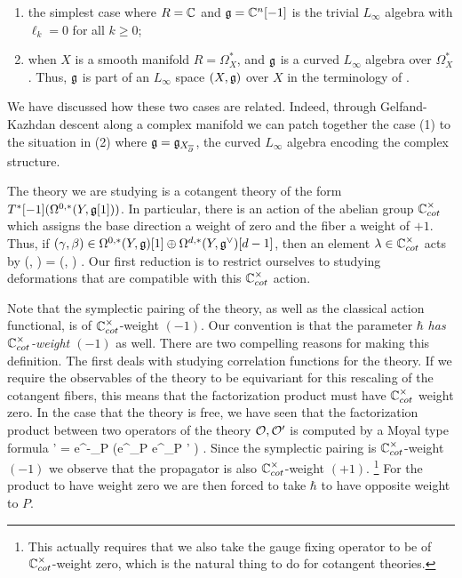 \begin{enumerate}
\item the simplest case where $R = \mathbb C$ and $\mathfrak g = \mathbb C^n[-1]$ is the trivial $L_\infty$ algebra with $\ell_k = 0$ for all $k \geq 0$; 
\item when $X$ is a smooth manifold $R = \Omega^*_X$, and $\mathfrak g$ is a curved $L_\infty$ algebra over $\Omega^*_X$. 
Thus, $\mathfrak g$ is part of an $L_\infty$ space $(X, \mathfrak g)$ over $X$ in the terminology of \cite{wg2, GradyGwilliamDerived}.
\end{enumerate}

We have discussed how these two cases are related.
Indeed, through Gelfand-Kazhdan descent along a complex manifold we can patch together the case (1) to the situation in (2) where $\mathfrak g = \mathfrak g_{X_{\overline{\partial}}}$, the curved $L_\infty$ algebra encoding the complex structure. 

The theory we are studying is a cotangent theory of the form $T^*[-1] (\Omega^{0,*}(Y, \mathfrak g[1]))$. 
In particular, there is an action of the abelian group $\mathbb C^\times_{cot}$ which assigns the base direction a weight of zero and the fiber a weight of $+1$. 
Thus, if $(\gamma, \beta) \in \Omega^{0,*}(Y, \mathfrak g) [1] \oplus \Omega^{d,*}(Y, \mathfrak g^\vee)[d-1]$, then an element $\lambda \in \mathbb C^\times_{cot}$ acts by
\ben
\lambda \cdot (\gamma, \beta) = (\gamma, \lambda \beta) .
\een
Our first reduction is to restrict ourselves to studying deformations that are compatible with this $\mathbb C^\times_{cot}$ action.

Note that the symplectic pairing of the theory, as well as the classical action functional, is of $\mathbb C^{\times}_{cot}$-weight $(-1)$.
Our convention is that the parameter $\hbar$ {\em has $\mathbb C^\times_{cot}$-weight $(-1)$} as well. 
There are two compelling reasons for making this definition. 
The first deals with studying correlation functions for the theory. 
If we require the observables of the theory to be equivariant for this rescaling of the cotangent fibers, this means that the factorization product must have $\mathbb C^\times_{cot}$ weight zero.
In the case that the theory is free, we have seen that the factorization product between two operators of the theory $\mathcal O, \mathcal O'$ is computed by a Moyal type formula
\ben
\cO \star \cO' = e^{-\hbar \partial_P} \left(e^{\hbar \partial_P} \cO \cdot e^{\hbar \partial_P} \cO' \right) .
\een
Since the symplectic pairing is $\mathbb C^\times_{cot}$-weight $(-1)$ we observe that the propagator is also $\mathbb C^\times_{cot}$-weight $(+1)$.
\footnote{This actually requires that we also take the gauge fixing operator to be of $\mathbb C^\times_{cot}$-weight zero, which is the natural thing to do for cotangent theories.}
For the product to have weight zero we are then forced to take $\hbar$ to have opposite weight to $P$.

